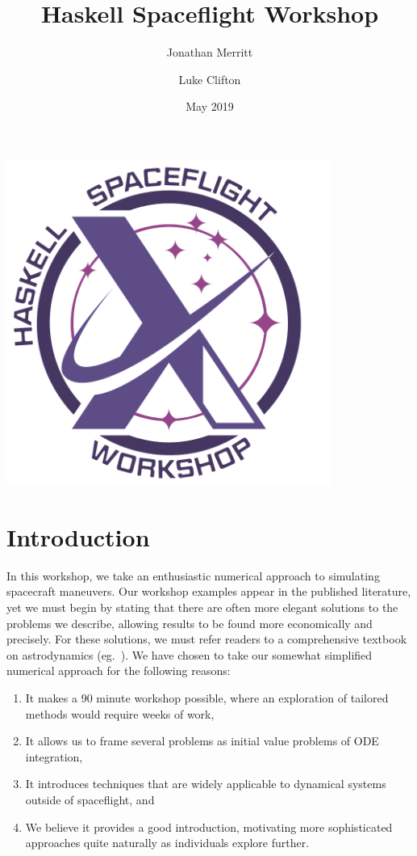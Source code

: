 \documentclass[12pt,openany]{book}
\title{Haskell Spaceflight Workshop}
\author{Jonathan Merritt \and Luke Clifton}
\date{May 2019}
\begin{document}
\begin{titlepage}
\begin{center}
  \vspace*{2cm}
  {\Huge\MakeUppercase{\thetitle}}\par
  \vspace{1.5cm}
  \includegraphics[width=0.8\textwidth]{fig/logo-text.pdf}\par
  \vspace{1.5cm}
  {\Large\theauthor}\par
  {\Large\thedate}\par           
\end{center}
\end{titlepage}

\tableofcontents

\chapter{Introduction}

In this workshop, we take an enthusiastic numerical approach to simulating spacecraft maneuvers. Our workshop examples appear in the published literature, yet we must begin by stating that there are often more elegant solutions to the problems we describe, allowing results to be found more economically and precisely. For these solutions, we must refer readers to a comprehensive textbook on astrodynamics (eg.~\cite{battin1999}). We have chosen to take our somewhat simplified numerical approach for the following reasons:
\begin{enumerate}
\item{It makes a 90 minute workshop possible, where an exploration of tailored methods would require weeks of work,}
\item{It allows us to frame several problems as initial value problems of ODE integration,}
\item{It introduces techniques that are widely applicable to dynamical systems outside of spaceflight, and}
\item{We believe it provides a good introduction, motivating more sophisticated approaches quite naturally as individuals explore further.}
\end{enumerate}

\clearpage{}
{}


\end{document}
